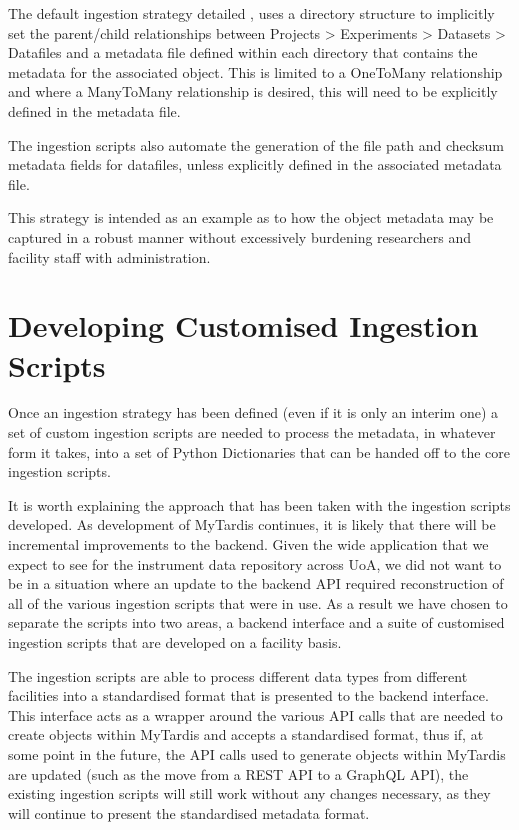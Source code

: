 \documentclass[letterpaper,10pt,english]{sphinxmanual}
\begin{document}
\sphinxAtStartPar
The default ingestion strategy detailed , uses a directory structure to implicitly set the parent/child relationships between Projects \sphinxhyphen{}\textgreater{} Experiments \sphinxhyphen{}\textgreater{} Datasets \sphinxhyphen{}\textgreater{} Datafiles and a metadata file defined within each directory that contains the metadata for the associated object. This is limited to a One\sphinxhyphen{}To\sphinxhyphen{}Many relationship and where a Many\sphinxhyphen{}To\sphinxhyphen{}Many relationship is desired, this will need to be explicitly defined in the metadata file.

\sphinxAtStartPar
The ingestion scripts also automate the generation of the file path and checksum metadata fields for datafiles, unless explicitly defined in the associated metadata file.

\sphinxAtStartPar
This strategy is intended as an example as to how the object metadata may be captured in a robust manner without excessively burdening researchers and facility staff with administration.


\section{Developing Customised Ingestion Scripts}
\label{\detokenize{index:developing-customised-ingestion-scripts}}\label{\detokenize{index:modding-scripts}}
\sphinxAtStartPar
Once an ingestion strategy has been defined (even if it is only an interim one) a set of custom ingestion scripts are needed to process the metadata, in whatever form it takes, into a set of Python Dictionaries that can be handed off to the core ingestion scripts.

\sphinxAtStartPar
It is worth explaining the approach that has been taken with the ingestion scripts developed. As development of MyTardis continues, it is likely that there will be incremental improvements to the backend. Given the wide application that we expect to see for the instrument data repository across UoA, we did not want to be in a situation where an update to the backend API required reconstruction of all of the various ingestion scripts that were in use. As a result we have chosen to separate the scripts into two areas, a backend interface and a suite of customised ingestion scripts that are developed on a facility basis.

\sphinxAtStartPar
The ingestion scripts are able to process different data types from different facilities into a standardised format that is presented to the backend interface. This interface acts as a wrapper around the various API calls that are needed to create objects within MyTardis and accepts a standardised format, thus if, at some point in the future, the API calls used to generate objects within MyTardis are updated (such as the move from a REST API to a GraphQL API), the existing ingestion scripts will still work without any changes necessary, as they will continue to present the standardised metadata format.
\end{document}
